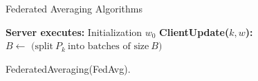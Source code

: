 \documentclass{beamer}
\begin{document}
\begin{frame}{Federated Averaging Algorithms}
			\begin{algorithm}[H]
			\SetAlgoLined
			\textbf{Server executes:} 	Initialization $w_0$ \;
			\textbf{ClientUpdate($k,w$):}\\
			$B \leftarrow \text{ (split} \ P_k	\ \text{into batches of size} \ B )$\\
			\caption{FederatedAveraging(FedAvg).}
		\end{algorithm}
		
\end{frame}
\end{document}
